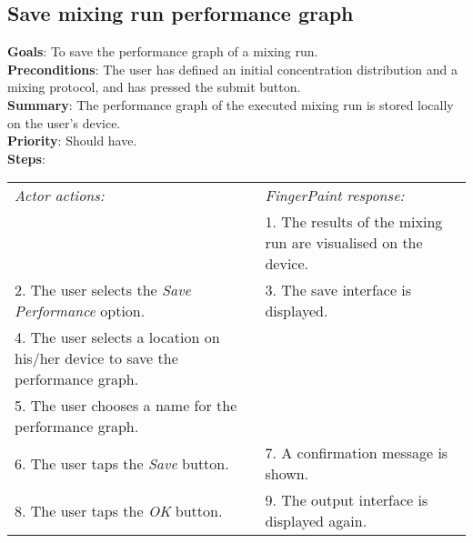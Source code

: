 \begin{appendices}
  \section{Save mixing run performance graph}
  \label{savemixgraph}
  \textbf{Goals}: To save the performance graph of a mixing run.\\
  \textbf{Preconditions}: The user has defined an initial concentration distribution and a mixing protocol, and has pressed the submit button.\\
  \textbf{Summary}: The performance graph of the executed mixing run is stored locally on the user's device.\\
  \textbf{Priority}: Should have.\\
  \textbf{Steps}: \\
  \begin{tabular}{ p{} p{} }
  	\emph{Actor actions:} & \emph{FingerPaint response:} \\
	   & 1. The results of the mixing run are visualised on the device. \\
	 2. The user selects the \emph{Save Performance} option. & 3. The save interface is displayed.\\
	 4. The user selects a location on his/her device to save the performance graph. & \\
	 5. The user chooses a name for the performance graph. & \\
	 6. The user taps the \emph{Save} button. & 7. A confirmation message is shown. \\
	 8. The user taps the \emph{OK} button. & 9. The output interface is displayed again. \\
  \end{tabular}


\end{appendices}

